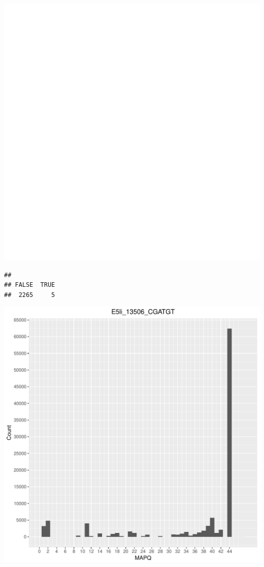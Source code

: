 \documentclass[12pt, a4paper]{article}\usepackage[]{graphicx}\usepackage[]{color}
\makeatletter
\def\maxwidth{ %
  \ifdim\Gin@nat@width>\linewidth
    \linewidth
  \else
    \Gin@nat@width
  \fi
}
\newenvironment{kframe}{%
 \def\at@end@of@kframe{}%
 \ifinner\ifhmode%
  \def\at@end@of@kframe{\end{minipage}}%
  \begin{minipage}{\columnwidth}%
 \fi\fi%
 \def\FrameCommand##1{\hskip\@totalleftmargin \hskip-\fboxsep
 \colorbox{shadecolor}{##1}\hskip-\fboxsep
     \hskip-\linewidth \hskip-\@totalleftmargin \hskip\columnwidth}%
 \MakeFramed {\advance\hsize-\width
   \@totalleftmargin\z@ \linewidth\hsize
   \@setminipage}}%
 {\par\unskip\endMakeFramed%
 \at@end@of@kframe}
\newenvironment{knitrout}{}{} %
\makeatother
\begin{document}
\begin{knitrout}
\includegraphics[width=\maxwidth]{figure/unnamed-chunk-3-8} 
\begin{kframe}\begin{verbatim}
## 
## FALSE  TRUE 
##  2265     5
\end{verbatim}
\end{kframe}
\includegraphics[width=\maxwidth]{figure/unnamed-chunk-3-9} 


\end{knitrout}
\end{document}
